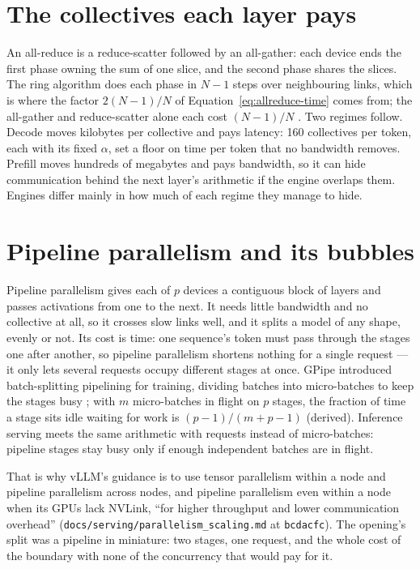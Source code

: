 \section{The collectives each layer pays}

An all-reduce is a reduce-scatter followed by an all-gather: each device ends
the first phase owning the sum of one slice, and the second phase shares the
slices. The ring algorithm does each phase in $N-1$ steps over neighbouring
links, which is where the factor $2(N-1)/N$ of
Equation~\eqref{eq:allreduce-time} comes from; the all-gather and
reduce-scatter alone each cost $(N-1)/N$ \cite{nccltests2026performance}. Two
regimes follow. Decode moves kilobytes per collective and pays latency: 160
collectives per token, each with its fixed $\alpha$, set a floor on time per
token that no bandwidth removes. Prefill moves hundreds of megabytes and pays
bandwidth, so it can hide communication behind the next layer's arithmetic if
the engine overlaps them. Engines differ mainly in how much of each regime they
manage to hide.

\section{Pipeline parallelism and its bubbles}

Pipeline parallelism gives each of $p$ devices a contiguous block of layers
and passes activations from one to the next. It needs little bandwidth and no
collective at all, so it crosses slow links well, and it splits a model of any
shape, evenly or not. Its cost is time: one sequence's token must pass through
the stages one after another, so pipeline parallelism shortens nothing for a
single request --- it only lets several requests occupy different stages at
once. GPipe introduced batch-splitting pipelining for training, dividing
batches into micro-batches to keep the stages busy \cite{huang2019gpipe}; with $m$
micro-batches in flight on $p$ stages, the fraction of time a stage sits idle
waiting for work is $(p-1)/(m+p-1)$ (derived). Inference serving meets the same
arithmetic with requests instead of micro-batches: pipeline stages stay busy
only if enough independent batches are in flight.

That is why vLLM's guidance is to use tensor parallelism within a node and
pipeline parallelism across nodes, and pipeline parallelism even within a node
when its GPUs lack NVLink, ``for higher throughput and lower communication
overhead'' (\texttt{docs/serving/parallelism\_scaling.md} at \texttt{bcdacfc}).
The opening's split was a pipeline in miniature: two stages, one request, and
the whole cost of the boundary with none of the concurrency that would pay for
it.

